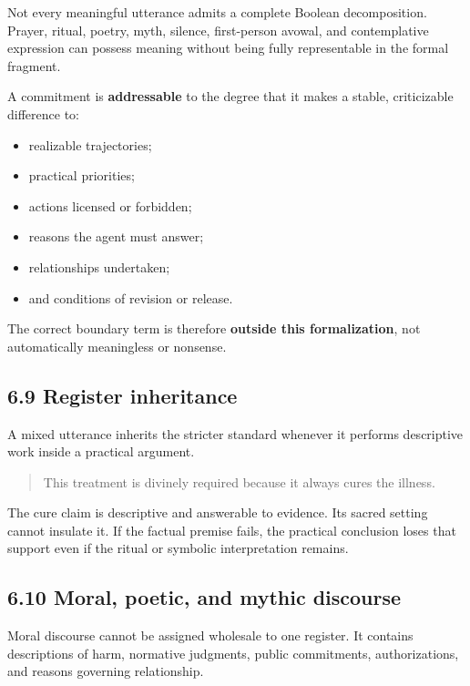 \documentclass[
  11pt,
]{article}
\providecommand{\tightlist}{%
  \setlength{\itemsep}{0pt}\setlength{\parskip}{0pt}}
\begin{document}
Not every meaningful utterance admits a complete Boolean decomposition.
Prayer, ritual, poetry, myth, silence, first-person avowal, and
contemplative expression can possess meaning without being fully
representable in the formal fragment.

A commitment is \textbf{addressable} to the degree that it makes a
stable, criticizable difference to:

\begin{itemize}
\tightlist
\item
  realizable trajectories;
\item
  practical priorities;
\item
  actions licensed or forbidden;
\item
  reasons the agent must answer;
\item
  relationships undertaken;
\item
  and conditions of revision or release.
\end{itemize}

The correct boundary term is therefore \textbf{outside this
formalization}, not automatically meaningless or nonsense.

\subsection{6.9 Register inheritance}\label{register-inheritance}

A mixed utterance inherits the stricter standard whenever it performs
descriptive work inside a practical argument.

\begin{quote}
This treatment is divinely required because it always cures the illness.
\end{quote}

The cure claim is descriptive and answerable to evidence. Its sacred
setting cannot insulate it. If the factual premise fails, the practical
conclusion loses that support even if the ritual or symbolic
interpretation remains.

\subsection{6.10 Moral, poetic, and mythic
discourse}\label{moral-poetic-and-mythic-discourse}

Moral discourse cannot be assigned wholesale to one register. It
contains descriptions of harm, normative judgments, public commitments,
authorizations, and reasons governing relationship.
\end{document}
